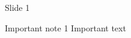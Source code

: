 \documentclass[9pt]{beamer}
\title{\hmwkClass}
\subtitle{\hmwkTitle}
\date{Lecture date: \hmwkDueDate}
\author[\hmwkAuthorLastName]{\hmwkAuthorFullName}
\begin{document}
\maketitle

\begin{frame}{Slide 1}
    \begin{alertblock}{Important note 1}
    	Important text
    \end{alertblock}
\end{frame}


\end{document}

